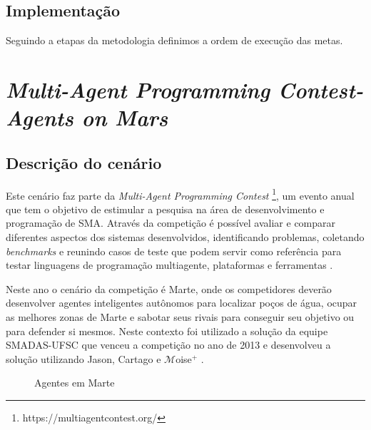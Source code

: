\subsection{Implementação}

Seguindo a etapas da metodologia definimos a ordem de execução das metas.
    
    
\section{\textit{Multi-Agent Programming Contest- Agents on Mars}}

\subsection{Descrição do cenário}

Este cenário faz parte da \textit{Multi-Agent Programming Contest} \footnote[1]{https://multiagentcontest.org/}, um evento anual que tem o objetivo de estimular a pesquisa na área de desenvolvimento e programação de SMA. Através da competição é possível avaliar e comparar diferentes aspectos dos sistemas desenvolvidos, identificando problemas, coletando \textit{benchmarks} e reunindo casos de teste que podem servir como referência para testar linguagens de programação multiagente, plataformas e ferramentas \cite{koster2012multi, ahlbrecht2013multi}.

Neste ano o cenário da competição é Marte, onde os competidores deverão desenvolver agentes inteligentes autônomos para localizar poços de água, ocupar
as melhores zonas de Marte e sabotar seus rivais para conseguir seu objetivo ou para defender si mesmos. Neste contexto foi utilizado a solução da equipe SMADAS-UFSC que venceu a competição no ano de 2013 e desenvolveu a solução utilizando Jason, Cartago e $\mathcal{M}$oise$^{+}$ \cite{zatelli2013smadas, ahlbrecht2013multi}.

\begin{figure}[ht]
  \centering
  \caption{Agentes em Marte}
  \label{fig:marte}
\end{figure}


